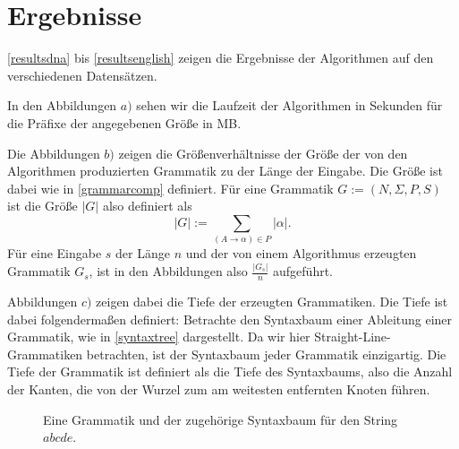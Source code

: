 \section{Ergebnisse}
\label{results}

\autoref{resultsdna} bis \ref{resultsenglish} zeigen die Ergebnisse der Algorithmen auf den verschiedenen Datensätzen. 

In den Abbildungen $a)$ sehen wir die Laufzeit der Algorithmen in Sekunden für die Präfixe der angegebenen Größe in MB.

Die Abbildungen $b)$ zeigen die Größenverhältnisse der Größe der von den Algorithmen produzierten Grammatik zu der Länge der Eingabe. Die Größe ist dabei wie in \autoref{grammarcomp} definiert. Für eine Grammatik $G :=(N, \Sigma, P, S)$ ist die Größe $|G|$ also definiert als
\begin{equation*}
	|G| := \sum_{(A \rightarrow \alpha) \in P} |\alpha|.
\end{equation*}
Für eine Eingabe $s$ der Länge $n$ und der von einem Algorithmus erzeugten Grammatik $G_s$, ist in den Abbildungen also $\tfrac{|G_s|}{n}$ aufgeführt.

Abbildungen $c)$ zeigen dabei die Tiefe der erzeugten Grammatiken. Die Tiefe ist dabei folgendermaßen definiert: Betrachte den Syntaxbaum einer Ableitung einer Grammatik, wie in \autoref{syntaxtree} dargestellt. Da wir hier Straight-Line-Grammatiken betrachten, ist der Syntaxbaum jeder Grammatik einzigartig. Die Tiefe der Grammatik ist definiert als die Tiefe des Syntaxbaums, also die Anzahl der Kanten, die von der Wurzel zum am weitesten entfernten Knoten führen.  

\begin{figure}
    \centering
    \caption{Eine Grammatik und der zugehörige Syntaxbaum für den String $abcde$.}
    \label{syntaxtree}
\end{figure}

